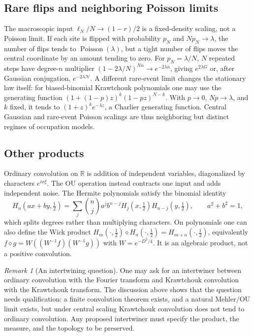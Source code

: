 \documentclass[11pt,reqno]{amsart}
\theoremstyle{definition}
\theoremstyle{remark}
\newtheorem{remark}[theorem]{Remark}
\newcommand{\R}{\mathbb R}
\newcommand{\NN}{\mathcal N}
\begin{document}
\subsection{Rare flips and neighboring Poisson limits}
The macroscopic input $\ell_N/N\to(1-r)/2$ is a fixed-density scaling,
not a Poisson limit. If each site is flipped with probability $p_N$
and $Np_N\to\lambda$, the number of flips tends to
$\operatorname{Poisson}(\lambda)$, but a tight number of flips moves
the central coordinate by an amount tending to zero.
For $p_N=\lambda/N$, $N$ repeated steps have degree-$n$ multiplier
$(1-2\lambda/N)^{Nn}\to e^{-2\lambda n}$, giving $e^{2\lambda G}$
or, after Gaussian conjugation, $e^{-2\lambda\NN}$.
A different rare-event limit changes the stationary law itself:
for biased-binomial Krawtchouk polynomials one may use the generating
function $(1+(1-p)z)^k(1-pz)^{N-k}$. With $p\to0$, $Np\to\lambda$,
and $k$ fixed, it tends to $(1+z)^ke^{-\lambda z}$, a Charlier generating
function. Central Gaussian and rare-event Poisson scalings are thus
neighboring but distinct regimes of occupation models.

\subsection{Other products}
Ordinary convolution on $\R$ is addition of independent variables,
diagonalized by characters $e^{ix\xi}$. The OU operation instead
contracts one input and adds independent noise. The Hermite polynomials
satisfy the binomial identity
\[
H_n(ax+by,\tfrac12)=\sum_j\binom nja^jb^{n-j}H_j(x,\tfrac12)H_{n-j}(y,\tfrac12),
\qquad a^2+b^2=1,
\]
which splits degrees rather than multiplying characters. On polynomials
one can also define the Wick product
$H_m(\cdot,\frac12)\diamond H_n(\cdot,\frac12)=H_{m+n}(\cdot,\frac12)$,
equivalently $f\diamond g=W((W^{-1}f)(W^{-1}g))$ with $W=e^{-D^2/4}$.
It is an algebraic product, not a positive convolution.

\begin{remark}[An intertwining question]
One may ask for an intertwiner between ordinary convolution with the
Fourier transform and Krawtchouk convolution with the Krawtchouk
transform. The discussion above shows that the question needs
qualification: a finite convolution theorem exists, and a natural
Mehler/OU limit exists, but under central scaling Krawtchouk convolution
does not tend to ordinary convolution. Any proposed intertwiner must
specify the product, the measure, and the topology to be preserved.
\end{remark}
\end{document}
